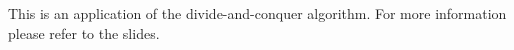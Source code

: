 This is an application of the divide-and-conquer algorithm.
For more information please refer to the slides.
